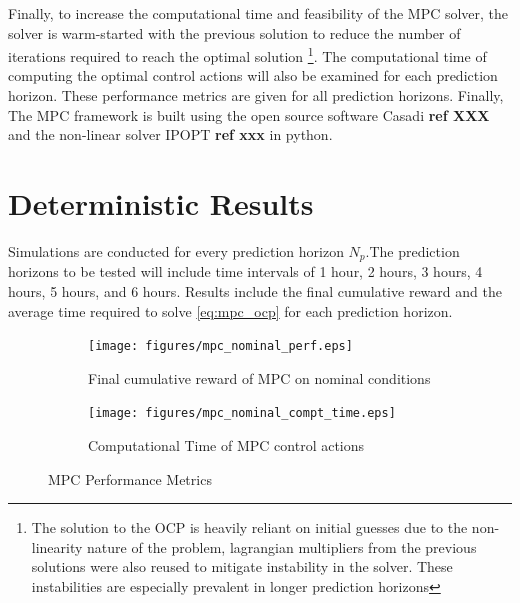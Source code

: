 Finally, to increase the computational time and feasibility of the MPC solver, the solver is warm-started with the previous solution to reduce the number of iterations required to reach the optimal solution  \footnote{The solution to the OCP is heavily reliant on initial guesses due to the non-linearity nature of the problem, lagrangian multipliers from the previous solutions were also reused to mitigate instability in the solver. These instabilities are especially prevalent in longer prediction horizons}. The computational time of computing the optimal control actions will also be examined for each prediction horizon. These performance metrics are given for all prediction horizons. Finally, The MPC framework is built using the open source software Casadi \textbf{ref XXX} and the non-linear solver IPOPT \textbf{ref xxx} in python. 

\section{Deterministic Results}
Simulations are conducted for every prediction horizon $N_p$.The prediction horizons to be tested will include time intervals of 1 hour, 2 hours, 3 hours, 4 hours, 5 hours, and 6 hours. Results include the final cumulative reward and the average time required to solve \autoref{eq:mpc_ocp} for each prediction horizon.

\begin{figure}[H]
	\centering
	\begin{subfigure}[b]{0.49\textwidth}
		\centering
		\texttt{[image: figures/mpc\_nominal\_perf.eps]}
		\caption{Final cumulative reward of MPC on nominal conditions}
		\label{fig:mpc_nominal_perf}
	\end{subfigure}
	\hfill
	\begin{subfigure}[b]{0.49\textwidth}
		\centering
		\texttt{[image: figures/mpc\_nominal\_compt\_time.eps]}
		\caption{Computational Time of MPC control actions}
		\label{fig:mpc_nominal_comp_time}
	\end{subfigure}
	\caption{MPC Performance Metrics}
	\label{fig:mpc_metrics_nominal}
\end{figure}

